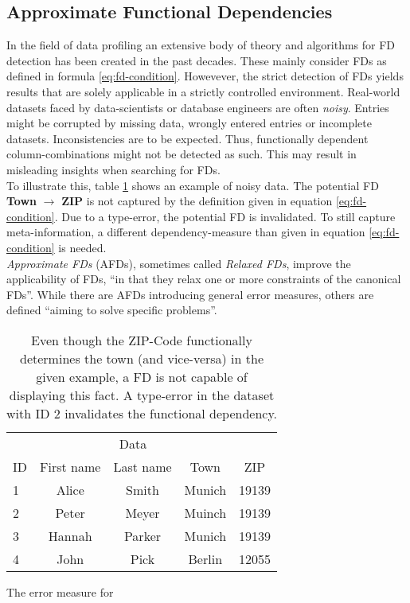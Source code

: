 \subsection{Approximate Functional Dependencies}
In the field of data profiling an extensive body of theory and algorithms for FD detection has been created in the past decades.\cite{PAP15}
These mainly consider FDs as defined in formula \ref{eq:fd-condition}.
Howevever, the strict detection of FDs yields results that are solely applicable in a strictly controlled environment.
Real-world datasets faced by data-scientists or database engineers are often \emph{noisy}.
Entries might be corrupted by missing data, wrongly entered entries or incomplete datasets.
Inconsistencies are to be expected.
Thus, functionally dependent column-combinations might not be detected as such. This may result in misleading insights when searching for FDs. \\

To illustrate this, table \ref{tab:example-afd-necessity} shows an example of noisy data.
The potential FD \textbf{Town} $\to$ \textbf{ZIP} is not captured by the definition given in equation \ref{eq:fd-condition}.
Due to a type-error, the potential FD is invalidated.
To still capture meta-information, a different dependency-measure than given in equation \ref{eq:fd-condition} is needed. \\

\emph{Approximate FDs} (AFDs), sometimes called \emph{Relaxed FDs}, improve the applicability of FDs, ``in that they relax one or more constraints of the canonical FDs''\cite[p.~1]{CAR16}. While there are AFDs introducing general error measures, others are defined ``aiming to solve specific problems''\cite[p.~1]{CAR16}. \\

\begin{table}[h]
	\centering
	\begin{tabular}{lcccc}
		\toprule
		& \multicolumn{3}{c}{Data} \\ \cmidrule(lr){2-5}
        ID & First name & Last name & Town & ZIP \\
		\midrule
        1 & Alice & Smith & Munich & 19139 \\
        2 & Peter & Meyer & Muinch & 19139 \\
        3 & Hannah & Parker & Munich & 19139  \\
        4 & John & Pick & Berlin & 12055 \\
		\bottomrule
	\end{tabular}
    \caption{Even though the ZIP-Code functionally determines the town (and vice-versa) in the given example, a FD is not capable of displaying this fact. A type-error in the dataset with ID 2 invalidates the functional dependency.}
	\label{tab:example-afd-necessity}
\end{table}

The error measure for 

